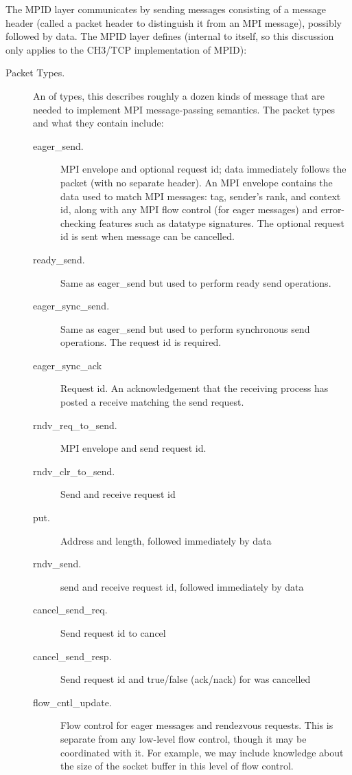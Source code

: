 \documentclass{article}
\begin{document}
The MPID layer communicates by sending messages consisting of a message header
(called a packet header to distinguish it from an MPI message), possibly
followed by data.  The MPID layer defines (internal to itself, so this
discussion only applies to the CH3/TCP implementation of MPID):
\begin{description}
\item[Packet Types.]An  of types, this describes roughly a
dozen kinds of 
  message that are needed to implement MPI message-passing semantics.  The
  packet types and what they contain include:
  \begin{description}
    \item[eager\_send.] MPI envelope and optional request id; data
      immediately follows the packet (with no separate header).  An
      MPI envelope contains the data used to match MPI messages: tag,
      sender's rank, and context id, along with any MPI flow control
      (for eager messages) and error-checking features such as
      datatype signatures.  The optional request id is sent when
      message can be cancelled.
    \item[ready\_send.] Same as eager\_send but used to perform ready
    send operations.
    \item[eager\_sync\_send.] Same as eager\_send but used to perform
    synchronous send operations.  The request id is required.
    \item[eager\_sync\_ack] Request id.  An acknowledgement that the
    receiving process has posted a receive matching the send request.
    \item[rndv\_req\_to\_send.]MPI envelope and send request id.
    \item[rndv\_clr\_to\_send.]Send and receive request id
    \item[put.]Address and length, followed immediately by data
    \item[rndv\_send.]send and receive request id, followed immediately by data
    \item[cancel\_send\_req.]Send request id to cancel
    \item[cancel\_send\_resp.]Send request id and true/false (ack/nack) for was
         cancelled
    \item[flow\_cntl\_update.]Flow control for eager messages and rendezvous
      requests.  This is separate from any low-level flow control, though it
      may be coordinated with it.  For example, we may include knowledge about
      the size of the socket buffer in this level of flow control.

\end{description}
\end{description}
\end{document}
